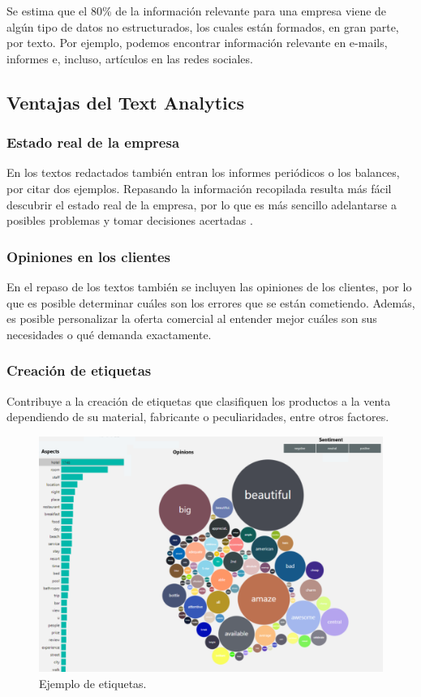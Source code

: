 Se estima que el 80\% de la información relevante para una empresa viene de algún tipo de datos no estructurados, los cuales están formados, en gran parte, por texto. Por ejemplo, podemos encontrar información relevante en e-mails, informes e, incluso, artículos en las redes sociales.



\subsection{Ventajas del Text Analytics}

\subsubsection{Estado real de la empresa}

En los textos redactados también entran los informes periódicos o los balances, por citar dos ejemplos. Repasando la información recopilada resulta más fácil descubrir el estado real de la empresa, por lo que es más sencillo adelantarse a posibles problemas y tomar decisiones acertadas \cite{Ormeno}.

\subsubsection{Opiniones en los clientes}

En el repaso de los textos también se incluyen las opiniones de los clientes, por lo que es posible determinar cuáles son los errores que se están cometiendo. Además, es posible personalizar la oferta comercial al entender mejor cuáles son sus necesidades o qué demanda exactamente.

\subsubsection{Creación de etiquetas}

Contribuye a la creación de etiquetas que clasifiquen los productos a la venta dependiendo de su material, fabricante o peculiaridades, entre otros factores.

\begin{figure}[htbp]
\centerline{\includegraphics[width = 0.5 \textwidth]{fig44.png}}
\caption{Ejemplo de etiquetas.}
\label{fig44}
\end{figure}

